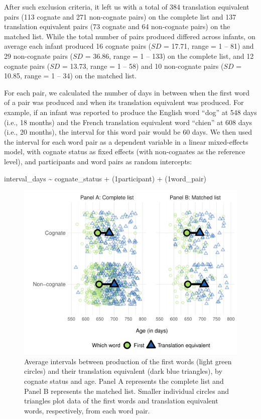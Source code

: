 \documentclass[
  ,man,floatsintext]{apa6}
\begin{document}
After such exclusion criteria, it left us with a total of 384 translation equivalent pairs (113 cognate and 271 non-cognate pairs) on the complete list and 137 translation equivalent pairs (73 cognate and 64 non-cognate pairs) on the matched list. While the total number of pairs produced differed across infants, on average each infant produced 16 cognate pairs (\(SD\) = 17.71, range = 1 -- 81) and 29 non-cognate pairs (\(SD\) = 36.86, range = 1 -- 133) on the complete list, and 12 cognate pairs (\(SD\) = 13.73, range = 1 -- 58) and 10 non-cognate pairs (\(SD\) = 10.85, range = 1 -- 34) on the matched list.

For each pair, we calculated the number of days in between when the first word of a pair was produced and when its translation equivalent was produced. For example, if an infant was reported to produce the English word ``dog'' at 548 days (i.e., 18 months) and the French translation equivalent word ``chien'' at 608 days (i.e., 20 months), the interval for this word pair would be 60 days. We then used the interval for each word pair as a dependent variable in a linear mixed-effects model, with cognate status as fixed effects (with non-cognates as the reference level), and participants and word pairs as random intercepts:

interval\_days \textasciitilde{} cognate\_status + (1\textbar participant) + (1\textbar word\_pair)

\begin{figure}

{\centering \includegraphics[width=1.2\linewidth]{CogVocab_paper_files/figure-latex/Fig3-1} 

}

\caption{Average intervals between production of the first words (light green circles) and their translation equivalent (dark blue triangles), by cognate status and age. Panel A represents the complete list and Panel B represents the matched list. Smaller individual circles and triangles plot data of the first words and translation equivalent words, respectively, from each word pair.}\label{fig:Fig3}
\end{figure}
\end{document}

